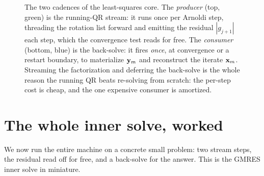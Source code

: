 \begin{figure}[t]
\centering
{}
\caption[Producer versus consumer: two cadences]{The two cadences of the least-squares
core. The \emph{producer} (top, green) is the running-QR stream: it runs once per
Arnoldi step, threading the rotation list forward and emitting the residual $|g_{j+1}|$
each step, which the convergence test reads for free. The \emph{consumer} (bottom, blue)
is the back-solve: it fires \emph{once}, at convergence or a restart boundary, to
materialize $\mathbf{y}_m$ and reconstruct the iterate $\mathbf{x}_m$. Streaming the factorization and
deferring the back-solve is the whole reason the running QR beats re-solving from
scratch: the per-step cost is cheap, and the one expensive consumer is amortized.}
\label{fig:gv-prodcons}
\end{figure}

\section{The whole inner solve, worked}
\label{sec:gv-worked}

We now run the entire machine on a concrete small problem: two stream steps, the
residual read off for free, and a back-solve for the answer. This is the GMRES inner
solve in miniature.

